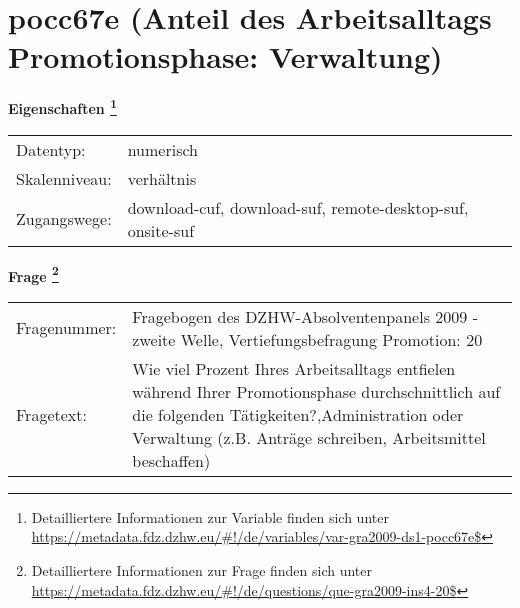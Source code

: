 
    \setcounter{footnote}{0}

    \vspace*{-1.8cm}
	\section{pocc67e (Anteil des Arbeitsalltags Promotionsphase: Verwaltung)}
	\label{section:pocc67e}



    \vspace*{0.5cm}
    \noindent\textbf{Eigenschaften
	\footnote{Detailliertere Informationen zur Variable finden sich unter
		\url{https://metadata.fdz.dzhw.eu/\#!/de/variables/var-gra2009-ds1-pocc67e$}}}\\
	\begin{tabularx}{\hsize}{@{}lX}
	Datentyp: & numerisch \\
	Skalenniveau: & verhältnis \\
	Zugangswege: &
	  download-cuf, 
	  download-suf, 
	  remote-desktop-suf, 
	  onsite-suf
 \\
    \end{tabularx}



				\vspace*{0.5cm}
                \noindent\textbf{Frage
	                \footnote{Detailliertere Informationen zur Frage finden sich unter
		              \url{https://metadata.fdz.dzhw.eu/\#!/de/questions/que-gra2009-ins4-20$}}}\\
				\begin{tabularx}{\hsize}{@{}lX}
					Fragenummer: &
					  Fragebogen des DZHW-Absolventenpanels 2009 - zweite Welle, Vertiefungsbefragung Promotion:
					  20
 \\
					Fragetext: & Wie viel Prozent Ihres Arbeitsalltags entfielen während Ihrer Promotionsphase durchschnittlich auf die folgenden Tätigkeiten?,Administration oder Verwaltung (z.B. Anträge schreiben, Arbeitsmittel beschaffen) \\
				\end{tabularx}





